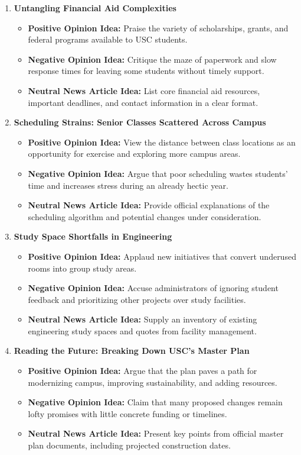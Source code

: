 \documentclass{article}
\begin{document}
\begin{enumerate}
    \item \textbf{Untangling Financial Aid Complexities}
    \begin{itemize}
        \item \textbf{Positive Opinion Idea:} Praise the variety of scholarships, grants, and federal programs available to USC students.
        \item \textbf{Negative Opinion Idea:} Critique the maze of paperwork and slow response times for leaving some students without timely support.
        \item \textbf{Neutral News Article Idea:} List core financial aid resources, important deadlines, and contact information in a clear format.
    \end{itemize}

    \item \textbf{Scheduling Strains: Senior Classes Scattered Across Campus}
    \begin{itemize}
        \item \textbf{Positive Opinion Idea:} View the distance between class locations as an opportunity for exercise and exploring more campus areas.
        \item \textbf{Negative Opinion Idea:} Argue that poor scheduling wastes students’ time and increases stress during an already hectic year.
        \item \textbf{Neutral News Article Idea:} Provide official explanations of the scheduling algorithm and potential changes under consideration.
    \end{itemize}

    \item \textbf{Study Space Shortfalls in Engineering}
    \begin{itemize}
        \item \textbf{Positive Opinion Idea:} Applaud new initiatives that convert underused rooms into group study areas.
        \item \textbf{Negative Opinion Idea:} Accuse administrators of ignoring student feedback and prioritizing other projects over study facilities.
        \item \textbf{Neutral News Article Idea:} Supply an inventory of existing engineering study spaces and quotes from facility management.
    \end{itemize}

    \item \textbf{Reading the Future: Breaking Down USC’s Master Plan}
    \begin{itemize}
        \item \textbf{Positive Opinion Idea:} Argue that the plan paves a path for modernizing campus, improving sustainability, and adding resources.
        \item \textbf{Negative Opinion Idea:} Claim that many proposed changes remain lofty promises with little concrete funding or timelines.
        \item \textbf{Neutral News Article Idea:} Present key points from official master plan documents, including projected construction dates.
    \end{itemize}


\end{enumerate}
\end{document}
